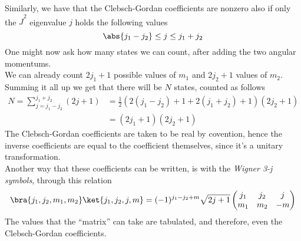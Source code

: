 \documentclass[a4paper, 11pt]{book}
\newcommand{\1}{\opr{\mathds{1}}}
\newcommand{\opr}[1]{\hat{#1}}
\theoremstyle{plain}
\begin{document}
	Similarly, we have that the Clebsch-Gordan coefficients are nonzero also if only the $\opr{J}^2$ eigenvalue $j$ holds the following values
	\begin{equation}
		\abs{j_1-j_2}\le j\le j_1+j_2
		\label{eq:jpermittedval}
	\end{equation}
	One might now ask how many states we can count, after adding the two angular momentums.\\
	We can already count $2j_1+1$ possible values of $m_1$ and $2j_2+1$ values of $m_2$. Summing it all up we get that there will be $N$ states, counted as follows
	\begin{equation}
		\begin{aligned}
			N=\sum_{j=j_1-j_2}^{j_1+j_2}(2j+1)&=\frac{1}{2}\left( 2(j_1-j_2)+1+2(j_1+j_2)+1 \right)(2j_2+1)\\
			&=\left( 2j_1+1 \right)\left( 2j_2+1 \right)
		\end{aligned}
		\label{eq:totangmomdeg}
	\end{equation}
	The Clebsch-Gordan coefficients are taken to be real by covention, hence the inverse coefficients are equal to the coefficient themselves, since it's a unitary transformation.\\
	Another way that these coefficients can be written, is with the \textit{Wigner 3-j symbols}, through this relation
	\begin{equation}
		\bra{j_1,j_2,m_1,m_2}\ket{j_1,j_2,j,m}=(-1)^{j_1-j_2+m}\sqrt{2j+1}\begin{pmatrix}
			j_1&j_2&j\\
			m_1&m_2&-m
		\end{pmatrix}
		\label{eq:wigner3jcoeff}
	\end{equation}
	The values that the ``matrix'' can take are tabulated, and therefore, even the Clebsch-Gordan coefficients.
\end{document}
